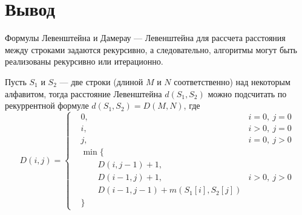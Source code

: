     \section*{Вывод}
    
        Формулы Левенштейна и Дамерау — Левенштейна для рассчета расстояния между строками задаются рекурсивно, а следовательно, алгоритмы могут быть реализованы рекурсивно или итерационно.
        
        Пусть $S_{1}$ и $S_{2}$ — две строки (длиной $M$ и $N$ соответственно) над некоторым алфавитом, тогда расстояние Левенштейна $d(S_{1},S_{2})$ можно подсчитать по рекуррентной формуле $d(S_{1},S_{2}) = D(M,N)$, где\\
        \begin{equation}
        	D(i,j) = 
        	\left \{ \begin{aligned}
        		& 0, & i = 0, \medspace j = 0\\
        		& i, & i > 0, \medspace j = 0\\
        		& j, & i = 0, \medspace j > 0\\
        		& \min\{ &\\
        		& \qquad D(i, j - 1) + 1, & \\
        		& \qquad D(i - 1, j) + 1, & i > 0, \medspace j > 0\\
        		& \qquad D(i - 1, j - 1) + m(S_{1}[i], S_{2}[j]) &\\
        		& \} &
        	\end{aligned} \right. 
        \end{equation}